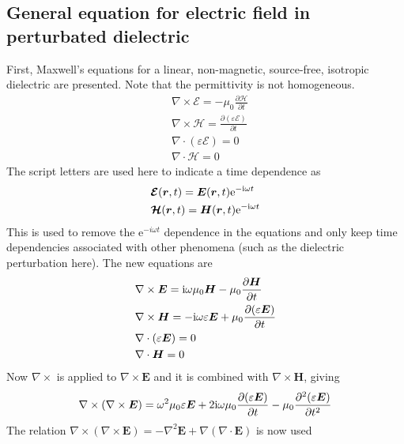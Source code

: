 \documentclass[11pt,twoside]{eitExjobb}
\begin{document}
	\subsection{General equation for electric field in perturbated dielectric \label{sec:app-derivations-scatter-general}}
	First, Maxwell's equations for a linear, non-magnetic, source-free, isotropic dielectric are presented. Note that the permittivity is not homogeneous.
	\begin{align*}
		&\nabla \times \bm{\mathcal{E}} = -\mu_0 \frac{\partial \bm{\mathcal{H}}}{\partial t} \\
		&\nabla \times \bm{\mathcal{H}} = \frac{\partial (\varepsilon \bm{\mathcal{E}})}{\partial t} \\
		&\nabla \cdot (\varepsilon \bm{\mathcal{E}}) = 0 \\
		&\nabla \cdot \bm{\mathcal{H}} = 0
	\end{align*}
	The script letters are used here to indicate a time dependence as
	\begin{align*}
		&\bm{\mathcal{E}}(\bm{r},t) = \bm{E}(\bm{r},t) \mathrm{e}^{-\mathrm{i}\omega t} \\
		&\bm{\mathcal{H}}(\bm{r},t) = \bm{H}(\bm{r},t) \mathrm{e}^{-\mathrm{i}\omega t}
	\end{align*}
	This is used to remove the e$^{-i\omega t}$ dependence in the equations and only keep time dependencies associated with other phenomena (such as the dielectric perturbation here). The new equations are
	\begin{align}
		&\nabla \times \bm{E} = \mathrm{i}\omega \mu_0 \bm{H} - \mu_0 \frac{\partial \bm{H}}{\partial t} \label{eq:app-scatter-faraday} \\
		&\nabla \times \bm{H} = -\mathrm{i}\omega \varepsilon \bm{E} + \mu_0 \frac{\partial (\varepsilon \bm{E})}{\partial t} \label{eq:app-scatter-ampere} \\
		&\nabla \cdot (\varepsilon \bm{E}) = 0 \label{eq:app-scatter-gauss} \\
		&\nabla \cdot \bm{H} = 0 \label{eq:app-scatter-magn}
	\end{align}
	Now $\nabla \times$ is applied to $\nabla \times \bm{E}$ and it is combined with $\nabla \times \bm{H}$, giving
	\begin{equation*}
		\nabla \times (\nabla \times \bm{E}) = \omega^2 \mu_0 \varepsilon \bm{E} + 2\mathrm{i} \omega \mu_0 \frac{\partial (\varepsilon \bm{E})}{\partial t} - \mu_0 \frac{\partial^2 (\varepsilon \bm{E})}{\partial t^2}
	\end{equation*}
	The relation $\nabla \times (\nabla \times \bm{E}) = -\nabla^2\bm{E} + \nabla(\nabla \cdot \bm{E})$ is now used
\end{document}
